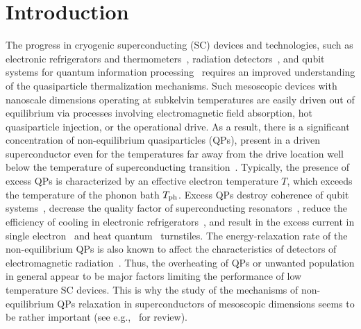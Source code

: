 \documentclass[prx,twocolumn,aps,superscriptaddress,showpacs,amsmath,amssymb,footnoteinbib]{revtex4-1}
\begin{document}
\section{Introduction}\label{IntroSection}
%
The progress in cryogenic superconducting (SC) devices and
technologies, such as electronic refrigerators and thermometers~\cite{Giazotto-Pekola-rmp06}, radiation detectors~\cite{Bolometers1,Bolometers2}, and qubit systems for quantum
information processing~\cite{Qubit1,Qubit2} requires an improved
understanding of the quasiparticle thermalization mechanisms. Such
mesoscopic devices with nanoscale dimensions operating at
subkelvin temperatures are easily driven out of equilibrium via
processes involving electromagnetic field absorption, hot
quasiparticle injection, or the operational drive. As a result,
there is a significant concentration of non-equilibrium
quasiparticles (QPs), present in a driven superconductor even for
the temperatures far away from the drive location well below the
temperature of superconducting transition~\cite{Catelani-Pekola_review21}. Typically, the presence
of excess QPs  is characterized by an effective electron
temperature $T$, which exceeds the temperature of the phonon bath
$T_{\rm ph}$. Excess QPs destroy coherence of qubit systems~\cite{QubitDecog1,QubitDecog2,QubitDecog3}, decrease the quality
factor of superconducting resonators~\cite{Q-Resonat1,Q-Resonat2},
reduce the efficiency of cooling in electronic refrigerators~\cite{Refrig1,Refrig2}, and result in the excess current in single
electron~\cite{TurnStile,SQS_turnstile,NEq_turnstile} and heat quantum~\cite{heat_turnstile} turnstiles.
The energy-relaxation rate of the non-equilibrium QPs is also known to affect the
characteristics of detectors of electromagnetic radiation~\cite{deVisser_detectors,Catelani-Pekola_review21}. Thus,
the overheating of QPs or unwanted population in general appear to
be major factors limiting the performance of low temperature SC
devices. This is why the study of the mechanisms of
non-equilibrium QPs relaxation in superconductors of mesoscopic
dimensions seems to be rather important (see e.g.,~\cite{Arutyunov-jpcm18} for review).
\end{document}
